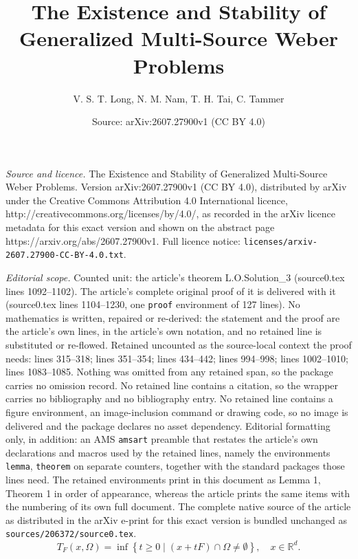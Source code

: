 \documentclass[10pt,a4paper]{amsart}
\title{The Existence and Stability of Generalized Multi-Source Weber Problems}
\author{V. S. T. Long, N. M. Nam, T. H. Tai, C. Tammer}
\date{Source: arXiv:2607.27900v1 (CC BY 4.0)}
\begin{document}
\maketitle

\noindent\emph{Source and licence.} The Existence and Stability of Generalized Multi-Source Weber Problems. Version arXiv:2607.27900v1 (CC BY 4.0), distributed by arXiv under the Creative Commons Attribution 4.0 International licence, http://creativecommons.org/licenses/by/4.0/, as recorded in the arXiv licence metadata for this exact version and shown on the abstract page https://arxiv.org/abs/2607.27900v1. Full licence notice: \texttt{licenses/arxiv-2607.27900-CC-BY-4.0.txt}.\par\smallskip

\noindent\textit{Editorial scope.} Counted unit: the article's theorem L.O.Solution\_3 (source0.tex lines 1092--1102). The article's complete original proof of it is delivered with it (source0.tex lines 1104--1230, one \texttt{proof} environment of 127 lines). No mathematics is written, repaired or re-derived: the statement and the proof are the article's own lines, in the article's own notation, and no retained line is substituted or re-flowed.  Retained uncounted as the source-local context the proof needs: lines 315--318; lines 351--354; lines 434--442; lines 994--998; lines 1002--1010; lines 1083--1085.  Nothing was omitted from any retained span, so the package carries no omission record.  No retained line contains a citation, so the wrapper carries no bibliography and no bibliography entry.  No retained line contains a figure environment, an image-inclusion command or drawing code, so no image is delivered and the package declares no asset dependency.  Editorial formatting only, in addition: an AMS \texttt{amsart} preamble that restates the article's own declarations and macros used by the retained lines, namely the environments \texttt{lemma}, \texttt{theorem} on separate counters, together with the standard packages those lines need.  The retained environments print in this document as Lemma 1, Theorem 1 in order of appearance, whereas the article prints the same items with the numbering of its own full document.  The complete native source of the article as distributed in the arXiv e-print for this exact version is bundled unchanged as \texttt{sources/206372/source0.tex}.
	\begin{equation}
		\label{minimaltime}
		T_F(x,\Omega) = \inf \left\{ t \geq 0 \mid (x + tF) \cap \Omega \neq \emptyset \right\}, \quad x \in \mathbb{R}^d.
	\end{equation}
\end{document}
